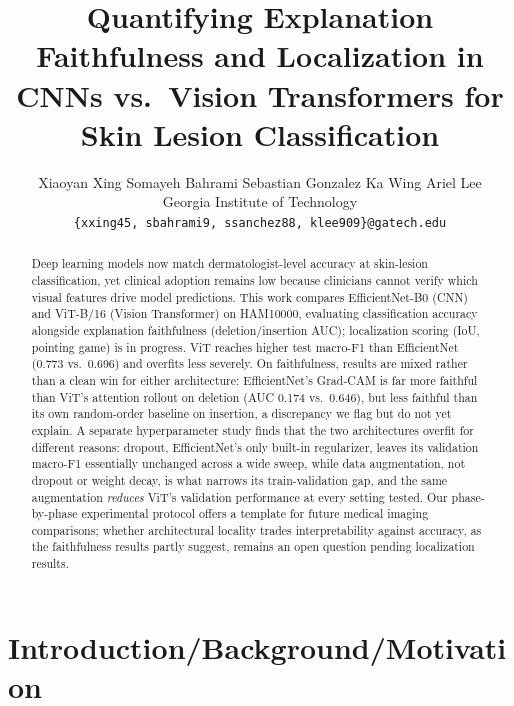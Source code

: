 \documentclass[10pt,twocolumn,letterpaper]{article}
\begin{document}

\title{Quantifying Explanation Faithfulness and Localization in CNNs vs.\ Vision Transformers for Skin Lesion Classification}

\author{Xiaoyan Xing \quad Somayeh Bahrami \quad Sebastian Gonzalez \quad Ka Wing Ariel Lee\\
Georgia Institute of Technology\\
{\tt\small \{xxing45, sbahrami9, ssanchez88, klee909\}@gatech.edu}
}

\maketitle


\begin{abstract}
Deep learning models now match dermatologist-level accuracy at skin-lesion
classification, yet clinical adoption remains low because clinicians cannot
verify which visual features drive model predictions. This work compares
EfficientNet-B0 (CNN) and ViT-B/16 (Vision Transformer) on HAM10000,
evaluating classification accuracy alongside explanation faithfulness
(deletion/insertion AUC); localization scoring (IoU, pointing game) is in
progress. ViT reaches higher test macro-F1 than EfficientNet (0.773 vs.\
0.696) and overfits less severely. On faithfulness, results are mixed rather
than a clean win for either architecture: EfficientNet's Grad-CAM is far more
faithful than ViT's attention rollout on deletion (AUC 0.174 vs.\ 0.646), but
less faithful than its own random-order baseline on insertion, a discrepancy
we flag but do not yet explain. A separate hyperparameter study finds that
the two architectures overfit for different reasons: dropout, EfficientNet's
only built-in regularizer, leaves its validation macro-F1 essentially
unchanged across a wide sweep, while data augmentation, not dropout or weight
decay, is what narrows its train-validation gap, and the same augmentation
\emph{reduces} ViT's validation performance at every setting tested. Our
phase-by-phase experimental protocol offers a template for future medical
imaging comparisons; whether architectural locality trades interpretability
against accuracy, as the faithfulness results partly suggest, remains an open
question pending localization results.
\end{abstract}


\section{Introduction/Background/Motivation}
\label{sec:intro}
\end{document}

